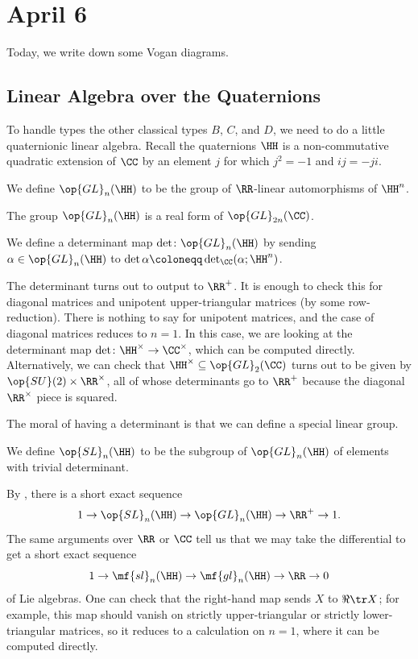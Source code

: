 \documentclass[../notes.tex]{subfiles}
\begin{document}
\section{April 6}
Today, we write down some Vogan diagrams.

\subsection{Linear Algebra over the Quaternions}
To handle types the other classical types $B$, $C$, and $D$, we need to do a little quaternionic linear algebra. Recall the quaternions $\HH$ is a non-commutative quadratic extension of $\CC$ by an element $j$ for which $j^2=-1$ and $ij=-ji$.
\begin{notation}
	We define $\op{GL}_n(\HH)$ to be the group of $\RR$-linear automorphisms of $\HH^n$.
\end{notation}
\begin{remark}
	The group $\op{GL}_n(\HH)$ is a real form of $\op{GL}_{2n}(\CC)$.
\end{remark}
\begin{definition}[determinant]
	We define a determinant map $\det\colon\op{GL}_n(\HH)$ by sending $\alpha\in\op{GL}_n(\HH)$ to $\det\alpha\coloneqq\det_\CC(\alpha;\HH^n)$.
\end{definition}
\begin{remark} \label{rem:det-is-positive}
	The determinant turns out to output to $\RR^+$. It is enough to check this for diagonal matrices and unipotent upper-triangular matrices (by some row-reduction). There is nothing to say for unipotent matrices, and the case of diagonal matrices reduces to $n=1$. In this case, we are looking at the determinant map $\det\colon\HH^\times\to\CC^\times$, which can be computed directly. Alternatively, we can check that $\HH^\times\subseteq\op{GL}_2(\CC)$ turns out to be given by $\op{SU}(2)\times\RR^\times$, all of whose determinants go to $\RR^+$ because the diagonal $\RR^\times$ piece is squared.
\end{remark}
The moral of having a determinant is that we can define a special linear group.
\begin{notation}
	We define $\op{SL}_n(\HH)$ to be the subgroup of $\op{GL}_n(\HH)$ of elements with trivial determinant.
\end{notation}
\begin{remark}
	By , there is a short exact sequence
	\[1\to\op{SL}_n(\HH)\to\op{GL}_n(\HH)\to\RR^+\to1.\]
	The same arguments over $\RR$ or $\CC$ tell us that we may take the differential to get a short exact sequence
	\[1\to\mf{sl}_n(\HH)\to\mf{gl}_n(\HH)\to\RR\to0\]
	of Lie algebras. One can check that the right-hand map sends $X$ to $\Re\tr X$; for example, this map should vanish on strictly upper-triangular or strictly lower-triangular matrices, so it reduces to a calculation on $n=1$, where it can be computed directly.
\end{remark}
\end{document}
